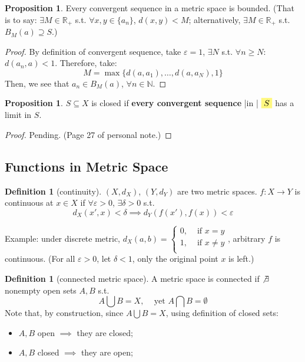 \documentclass[12pt]{article}
\newcommand{\N}{{\mathbb N}}
\newcommand{\R}{{\mathbb R}}
\theoremstyle{definition}
\newtheorem{definition}[theorem]{Definition}
\newtheorem{proposition}[theorem]{Proposition}
\theoremstyle{plain}
\newcommand{\highlight}[1]{%
 \colorbox{yellow!50}{$\displaystyle#1$}}
\begin{document}
\begin{proposition}
    Every convergent sequence in a metric space is bounded. (That is  to say:
    $\exists M \in \R_+$ s.t.  $\forall x,y \in \{ a_n \}$, $d(x,y) <   M$;
    alternatively, $\exists M \in \R_+$ s.t. $B_M(a) \supseteq S$.)
    \begin{proof}
        By definition of convergent sequence, take $\varepsilon = 1$, $\exists N
        $ s.t. $\forall n \ge N$: $d(a_n , a ) < 1$. Therefore, take:
        \[
            M = \max \{ d(a,a_1), \ldots, d(a, a_N), 1\}
        \]
        Then, we see that $a_n \in B_M(a)$, $\forall n \in \N$.
    \end{proof}
\end{proposition}

\begin{proposition}
    $S\subseteq X$ is closed if \textbf{every convergent sequence} \yverb|in | $\highlight{S}$ has a  limit in
    $S$.
    \begin{proof}
        Pending. (Page 27 of personal note.)
    \end{proof}
\end{proposition}


\subsection{Functions in Metric Space}
\setcounter{theorem}{0}
\begin{definition}
    [continuity]
    $(X, d_X)$, $(Y, d_Y)$ are two metric spaces. $f: X\to Y$ is continuous at
    $x \in X$ if $\forall \varepsilon > 0$, $\exists \delta > 0$ s.t.
    \[
        d_X(x', x) < \delta \implies
        d_Y(f(x'), f(x)) < \varepsilon
    \]
\end{definition}

Example: under discrete metric, $d_X(a,b) = \begin{cases}
    0 , &\text{ if } x = y\\
    1 , &\text{ if } x \not= y\\
\end{cases}$, arbitrary $f$ is continuous. (For all $\varepsilon > 0$, let
$\delta < 1$, only the original point $x$ is left.)

\begin{definition}
    [connected metric space]
    A metric space is connected if $\not\exists $ nonempty open sets $A,B$ s.t.
    \[
        A \bigcup B = X, \;\;\; \text{ yet } A \bigcap B = \emptyset
    \]
    Note that, by construction, since $A\bigcup B = X$, using definition of
    closed sets:
    \begin{itemize}
        \item $A, B$ open $\implies$ they are closed;
        \item $A, B$ closed $\implies$ they are open;
    \end{itemize}
\end{definition}
\end{document}
